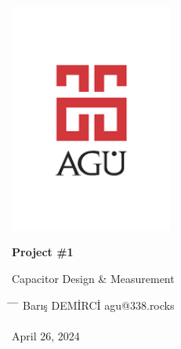 \begin{center}
	\includegraphics[width=0.4\textwidth]{assets/agu.png}

	\Huge
	\textbf{Project \#1}

	\vspace{0.3cm}
	\Huge
	Capacitor Design \& Measurement

	\vspace{0.8cm}
	\large
	\vspace{0.5cm}
	\LARGE
	\vspace{1.5cm}
	\textbf{}
	\vfill
	\vspace{0.8cm}
	\Large
\end{center}

\begin{tabbing}
	\hspace*{1em} \= \hspace*{8em} \= \hspace*{11em} \= \kill
	\> Barış DEMİRCİ \> agu@338.rocks \> \\
	\> \> \> \\
	\>  April 26, 2024 \> \> \\
\end{tabbing}
